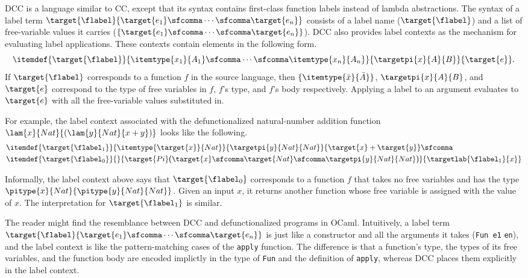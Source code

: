 DCC is a language similar to CC, except that its syntax contains first-class function labels instead of lambda abstractions. The syntax of a label term $\target{\flabel}\{\target{e_1} \sfcomma \cdots \sfcomma \target{e_n}\}$ consists of a label name ($\target{\flabel}$) and a list of free-variable values it carries ($\{\target{e_1} \sfcomma \cdots \sfcomma \target{e_n}\}$). DCC also provides label contexts as the mechanism for evaluating label applications. These contexts contain elements in the following form.
\begin{equation*}
	\itemdef{\target{\flabel}}{\itemtype{x_1}{A_1} \sfcomma \cdots \sfcomma \itemtype{x_n}{A_n}}{\targetpi{x}{A}{B}}{\target{e}}.
\end{equation*}
If $\target{\flabel}$ corresponds to a function $f$ in the source language, then $\{\itemtype{\bar{x}}{\bar{A}}\}$, $\targetpi{x}{A}{B}$, and $\target{e}$ correspond to the type of free variables in $f$, $f$'s type, and $f$'s body respectively. Applying a label to an argument evaluates to $\target{e}$ with all the free-variable values substituted in.

For example, the label context associated with the defunctionalized natural-number addition function 
$\lam{x}{Nat}{(\lam{y}{Nat}{x + y})}$ looks like the following.
\begin{align*}
	&\itemdef{\target{\flabel_1}}{\itemtype{\target{x}}{Nat}}{\targetpi{y}{Nat}{Nat}}{\target{x} + \target{y}}\sfcomma\\
	& \itemdef{\target{\flabel_0}}{}
	{\target{Pi}\textsf{(}\target{x}\sfcomma \target{Nat}\sfcomma \targetpi{y}{Nat}{Nat}\textsf{)}}
	{\targetlab{\flabel_1}{x}}
\end{align*}

Informally, the label context above says that $\target{\flabel_0}$ corresponds to a function $f$ that takes no free variables and has the type $\pitype{x}{Nat}{\pitype{y}{Nat}{Nat}}$. Given an input $x$, it returns another function whose free variable is assigned with the value of $x$. The interpretation for $\target{\flabel_1}$ is similar.

The reader might find the resemblance between DCC and defunctionalized programs in OCaml. Intuitively, a label term $\target{\flabel}\{\target{e_1} \sfcomma \cdots \sfcomma \target{e_n}\}$ is just like a constructor and all the arguments it takes (\texttt{Fun e1} \codemath{\cdots} \texttt{en}), and the label context is like the pattern-matching cases of the \texttt{apply} function. The difference is that a function's type, the types of its free variables, and the function body are encoded implictly in the type of \texttt{Fun} and the definition of \texttt{apply}, whereas DCC places them explicitly in the label context. 




